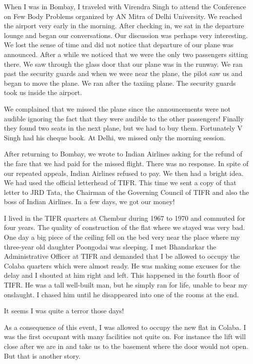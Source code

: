 When I was in Bombay, I traveled with Virendra Singh to attend the 
Conference on Few Body Problems organized by AN Mitra of Delhi 
University. We reached the airport very early in the morning. After 
checking in, we sat in the departure lounge and began our conversations. 
Our discussion was perhaps very interesting. We lost the sense of time 
and did not notice that departure of our plane was announced. After a 
while we noticed that we were the only two passengers sitting there. We 
saw through the glass door that our plane was in the runway. We ran past 
the security guards and when we were near the plane, the pilot saw us 
and began to move the plane. We ran after the taxiing plane. The 
security guards took us inside the airport.

We complained that we missed the plane since the announcements were not 
audible ignoring the fact that they were audible to the other 
passengers! Finally they found two seats in the next plane, but we had 
to buy them. Fortunately V Singh had his cheque book. At Delhi, we 
missed only the morning session.

After returning to Bombay, we wrote to Indian Airlines asking for the 
refund of the fare that we had paid for the missed flight. There was no 
response. In spite of our repeated appeals, Indian Airlines refused to 
pay. We then had a bright idea. We had used the official letterhead of 
TIFR. This time we sent a copy of that letter to JRD Tata, the Chairman 
of the Governing Council of TIFR and also the boss of Indian Airlines. 
In a few days, we got our money!

I lived in the TIFR quarters at Chembur during 1967 to 1970 and commuted 
for four years. The quality of construction of the flat where we stayed 
was very bad. One day a big piece of the ceiling fell on the bed very 
near the place where my three-year old daughter Poongodai was sleeping. 
I met Bhandarkar the Administrative Officer at TIFR and demanded that I 
be allowed to occupy the Colaba quarters which were almost ready. He was 
making some excuses for the delay and I shouted at him right and left. 
This happened in the fourth floor of TIFR. He was a tall well-built man, 
but he simply ran for life, unable to bear my onslaught. I chased him 
until he disappeared into one of the rooms at the end.

It seems I was quite a terror those days!

As a consequence of this event, I was allowed to occupy the new flat in 
Colaba. I was the first occupant with many facilities not quite on. For 
instance the lift will close after we are in and take us to the basement 
where the door would not open. But that is another story.

